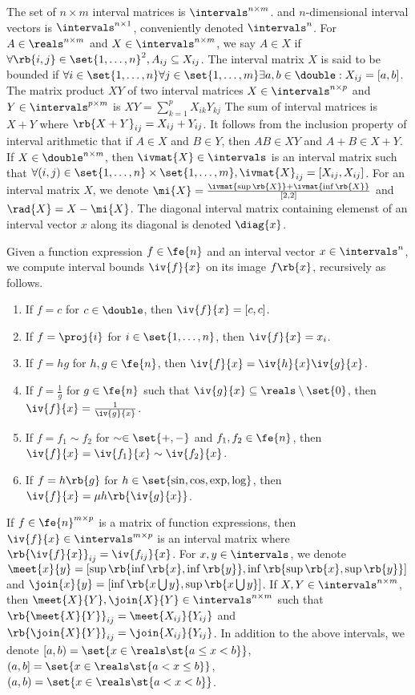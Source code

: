 The set of $n\times m$ interval matrices is $\intervals^{n\times m}$.
and $n$-dimensional interval vectors is $\intervals^{n\times 1}$,
conveniently denoted $\intervals^{n}$.  For $A\in\reals^{n\times m}$
and $X\in\intervals^{n\times m}$, we say $A\in X$ if
$\forall \rb{i,j}\in\set{1,\ldots,n}^2, A_{ij}\subseteq X_{ij}$.  The
interval matrix $X$ is said to be bounded if $\forall
i\in\set{1,\ldots,n}\forall j\in\set{1,\ldots,m} \exists
a,b\in\double: X_{ij} = [a,b]$.  The matrix product $XY$ of two
interval matrices $X\in\intervals^{n\times p}$ and
$Y\in\intervals^{p\times m}$ is $XY = \sum_{k=1}^pX_{ik}Y_{kj}$ The
sum of interval matrices is $X + Y$ where $\rb{X+Y}_{ij} = X_{ij} +
Y_{ij}$.  It follows from the inclusion property of interval
arithmetic that if $A\in X$ and $B\in Y$, then $AB\in XY$ and $A+B\in
X+Y$.  If $X\in\double^{n\times m}$, then $\ivmat{X}\in\intervals$ is
an interval matrix such that $\forall
(i,j)\in\set{1,\ldots,n}\times\set{1,\ldots,m},\ivmat{X}_{ij} =
[X_{ij},X_{ij}]$.  For an interval matrix $X$, we denote $\mi{X}
= \frac{\ivmat{\sup\rb{X}} + \ivmat{\inf\rb{X}}}{[2,2]}$ and $\rad{X}
= X - \mi{X}$.  The diagonal interval matrix containing elemenst of an
interval vector $x$ along its diagonal is denoted $\diag{x}$.

Given a function expression $f\in\fe{n}$ and an
interval vector $x\in\intervals^n$, we compute interval bounds
$\iv{f}{x}$ on its image $f\rb{x}$, recursively as follows.
%
\begin{enumerate}
\item If $f = c$ for $c\in\double$, then $\iv{f}{x} = [c,c]$.
\item If $f = \proj{i}$ for $i\in\set{1,\ldots,n}$, then $\iv{f}{x} =
x_i$.
\item If $f = hg$ for $h,g\in\fe{n}$, then $\iv{f}{x}
= \iv{h}{x}\iv{g}{x}$.
\item If $f = \frac{1}{g}$ for $g\in\fe{n}$ such that
$\iv{g}{x}\subseteq\reals\setminus \set{0}$, then $\iv{f}{x}
= \frac{1}{\iv{g}{x}}$.
\item If $f = f_1\sim f_2$ for $\sim\in\set{+,-}$ and
$f_1,f_2\in\fe{n}$, then $\iv{f}{x} = \iv{f_1}{x}\sim\iv{f_2}{x}$.
\item If $f = h\rb{g}$ for $h\in\set{\sin, \cos, \exp, \log}$, then
$\iv{f}{x} = \mu{h}\rb{\iv{g}{x}}$.
\end{enumerate}
%
If $f\in\fe{n}^{m\times p}$ is a matrix of function expressions, then
$\iv{f}{x}\in \intervals^{m\times p}$ is an interval matrix where
$\rb{\iv{f}{x}}_{ij} = \iv{f_{ij}}{x}$.  For $x,y\in\intervals$, we
denote $\meet{x}{y} =
[\sup\rb{\inf\rb{x},\inf\rb{y}},\inf\rb{\sup\rb{x},\sup\rb{y}}]$ and
$\join{x}{y} = [\inf\rb{x\bigcup y}, \sup\rb{x\bigcup y}]$.  If
$X,Y\in\intervals^{n\times m}$, then
$\meet{X}{Y},\join{X}{Y}\in\intervals^{n\times m}$ such that
$\rb{\meet{X}{Y}}_{ij} = \meet{X_{ij}}{Y_{ij}}$ and
$\rb{\join{X}{Y}}_{ij} = \join{X_{ij}}{Y_{ij}}$.
%
In addition to the above intervals, we denote
%
$[a,b) = \set{x\in\reals\st{a\leq x<b}}$, $(a,b] = \set{x\in\reals\st{a< x\leq b}}$, $(a,b) = \set{x\in\reals\st{a< x < b}}$.
